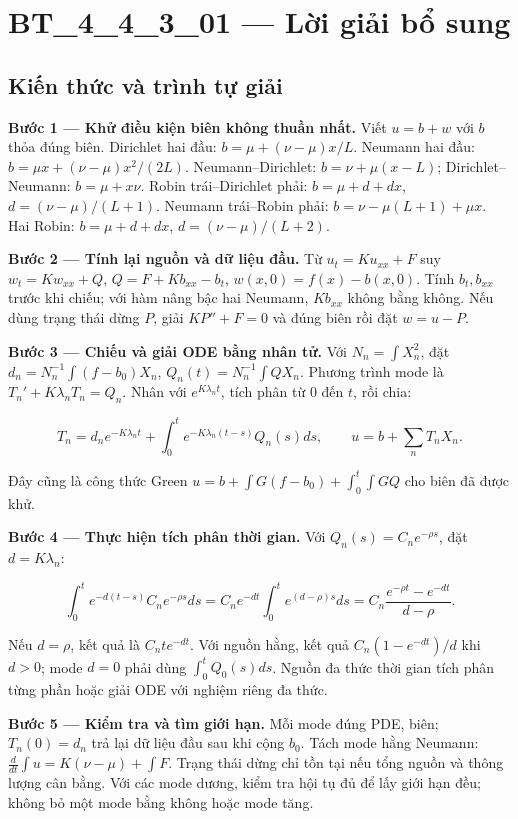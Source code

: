 \documentclass[10pt,a4paper]{article}
\begin{document}
\section*{BT\_4\_4\_3\_01 — Lời giải bổ sung}
\subsection*{Kiến thức và trình tự giải}
\textbf{Bước 1 — Khử điều kiện biên không thuần nhất.} Viết $u=b+w$ với $b$ thỏa đúng biên. Dirichlet hai đầu: $b=\mu+(\nu-\mu)x/L$. Neumann hai đầu: $b=\mu x+(\nu-\mu)x^2/(2L)$. Neumann–Dirichlet: $b=\nu+\mu(x-L)$; Dirichlet–Neumann: $b=\mu+x\nu$. Robin trái–Dirichlet phải: $b=\mu+d+dx$, $d=(\nu-\mu)/(L+1)$. Neumann trái–Robin phải: $b=\nu-\mu(L+1)+\mu x$. Hai Robin: $b=\mu+d+dx$, $d=(\nu-\mu)/(L+2)$.

\textbf{Bước 2 — Tính lại nguồn và dữ liệu đầu.} Từ $u_t=Ku_{xx}+F$ suy $w_t=Kw_{xx}+Q$, $Q=F+Kb_{xx}-b_t$, $w(x,0)=f(x)-b(x,0)$. Tính $b_t,b_{xx}$ trước khi chiếu; với hàm nâng bậc hai Neumann, $Kb_{xx}$ không bằng không. Nếu dùng trạng thái dừng $P$, giải $KP''+F=0$ và đúng biên rồi đặt $w=u-P$.

\textbf{Bước 3 — Chiếu và giải ODE bằng nhân tử.} Với $N_n=\int X_n^2$, đặt $d_n=N_n^{-1}\int(f-b_0)X_n$, $Q_n(t)=N_n^{-1}\int QX_n$. Phương trình mode là $T_n'+K\lambda_nT_n=Q_n$. Nhân với $e^{K\lambda_nt}$, tích phân từ $0$ đến $t$, rồi chia:


\[
T_n=d_ne^{-K\lambda_nt}+\int_0^te^{-K\lambda_n(t-s)}Q_n(s)ds,\qquad
u=b+\sum_nT_nX_n.
\]


Đây cũng là công thức Green $u=b+\int G(f-b_0)+\int_0^t\int GQ$ cho biên đã được khử.

\textbf{Bước 4 — Thực hiện tích phân thời gian.} Với $Q_n(s)=C_ne^{-\rho s}$, đặt $d=K\lambda_n$:


\[
\int_0^te^{-d(t-s)}C_ne^{-\rho s}ds
=C_ne^{-dt}\int_0^te^{(d-\rho)s}ds
=C_n\frac{e^{-\rho t}-e^{-dt}}{d-\rho}.
\]


Nếu $d=\rho$, kết quả là $C_nte^{-dt}$. Với nguồn hằng, kết quả $C_n(1-e^{-dt})/d$ khi $d>0$; mode $d=0$ phải dùng $\int_0^tQ_0(s)ds$. Nguồn đa thức thời gian tích phân từng phần hoặc giải ODE với nghiệm riêng đa thức.

\textbf{Bước 5 — Kiểm tra và tìm giới hạn.} Mỗi mode đúng PDE, biên; $T_n(0)=d_n$ trả lại dữ liệu đầu sau khi cộng $b_0$. Tách mode hằng Neumann: $\frac d{dt}\int u=K(\nu-\mu)+\int F$. Trạng thái dừng chỉ tồn tại nếu tổng nguồn và thông lượng cân bằng. Với các mode dương, kiểm tra hội tụ đủ để lấy giới hạn đều; không bỏ một mode bằng không hoặc mode tăng.
\end{document}
